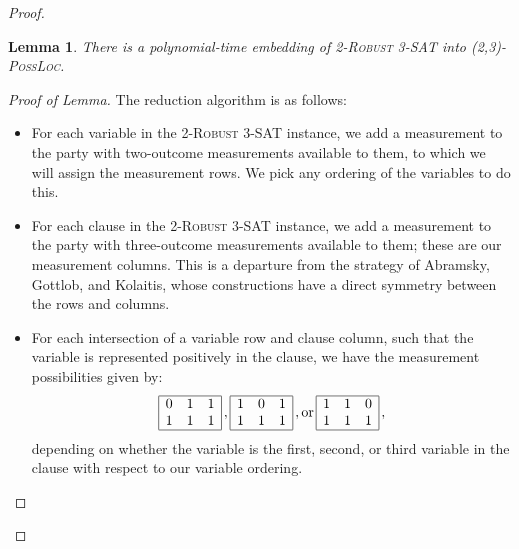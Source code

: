 \documentclass[reprint]{revtex4-1}
\newtheorem{lem}{Lemma}
\theoremstyle{definition}
\begin{document}
\begin{proof}
\begin{lem}\label{nplem}
There is a polynomial-time embedding of \textsc{2-Robust 3-SAT} into \textsc{(2,3)-PossLoc}.
\end{lem}
\begin{proof}[Proof of Lemma]
The reduction algorithm is as follows:
\begin{itemize}
\item For each variable in the \textsc{2-Robust 3-SAT} instance, we add a measurement to the party with two-outcome measurements available to them, to which we will assign the measurement rows. We pick any ordering of the variables to do this.

\item For each clause in the \textsc{2-Robust 3-SAT} instance, we add a measurement to the party with three-outcome measurements available to them; these are our measurement columns. This is a departure from the strategy of Abramsky, Gottlob, and Kolaitis, whose constructions have a direct symmetry between the rows and columns.

\item For each intersection of a variable row and clause column, such that the variable is represented positively in the clause, we have the measurement possibilities given by:
\begin{equation*}
\begin{array}{  | c c  c|}
\hline
 0 & 1 & 1 \\
 1 & 1& 1 \\ \hline
 \end{array}\, ,
 \begin{array}{  | c c  c|}
\hline
 1 &0 & 1 \\
 1 & 1& 1 \\ \hline
 \end{array} \, ,
 \mbox{or} \,
 \begin{array}{  | c c  c|}
\hline
 1 & 1 & 0\\
 1 & 1& 1 \\ \hline
 \end{array}\, ,
 \end{equation*}
depending on whether the variable is the first, second, or third variable in the clause with respect to our variable ordering.


\end{itemize}
\end{proof}
\end{proof}
\end{document}
